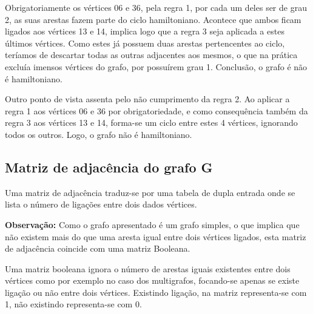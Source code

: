 Obrigatoriamente os vértices 06 e 36, pela regra 1, por cada um deles ser de grau 2, as suas arestas fazem 
parte do ciclo hamiltoniano. Acontece que ambos ficam ligados aos vértices 13 e 14, implica logo que a regra 3 
seja aplicada a estes últimos vértices. Como estes já possuem duas arestas pertencentes ao ciclo, teríamos de 
descartar todas as outras adjacentes aos mesmos, o que na prática excluía imensos vértices do grafo, por 
possuírem grau 1. Conclusão, o grafo é não é hamiltoniano.\par
Outro ponto de vista assenta pelo não cumprimento da regra 2. Ao aplicar a regra 1 aos vértices 06 e 36 
por obrigatoriedade, e como consequência também da regra 3 aos vértices 13 e 14, forma-se um ciclo entre 
estes 4 vértices, ignorando todos os outros. Logo, o grafo não é hamiltoniano.\par
\subsection{ Matriz de adjacência do grafo G }
Uma matriz de adjacência traduz-se por uma tabela de dupla entrada onde se lista o número de ligações 
entre dois dados vértices.\par
\textbf{Observação:} Como o grafo apresentado é um grafo simples, o que implica que não existem mais do que 
uma aresta igual entre dois vértices ligados, esta matriz de adjacência coincide com uma matriz Booleana.\par
Uma matriz booleana ignora o número de arestas iguais existentes entre dois vértices como por exemplo 
no caso dos multigrafos, focando-se apenas se existe ligação ou não entre dois vértices. Existindo ligação, na 
matriz representa-se com 1, não existindo representa-se com 0.\par

